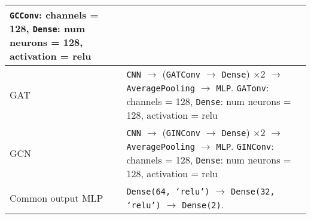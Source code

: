 \begin{tabular}{p{}p{}}
        \texttt{GCConv}: channels = 128, \texttt{Dense}: num neurons = 128, activation = relu \\\hline
    GAT               &
        \texttt{CNN} $\to$ (\texttt{GATConv} $\to$ \texttt{Dense}) $\times 2$ $\to$ \texttt{AveragePooling} $\to$ \texttt{MLP}. \newline
        \texttt{GATonv}: channels = 128, \texttt{Dense}: num neurons = 128, activation = relu \\\hline
    GCN               &
        \texttt{CNN} $\to$ (\texttt{GINConv} $\to$ \texttt{Dense}) $\times 2$ $\to$ \texttt{AveragePooling} $\to$ \texttt{MLP}. \newline
        \texttt{GINConv}: channels = 128, \texttt{Dense}: num neurons = 128, activation = relu \\\hline
    Common output MLP & \texttt{Dense(64, `relu')} $\to$ \texttt{Dense(32, `relu')} $\to$ \texttt{Dense(2)}. \\ \bottomrule
\end{tabular}